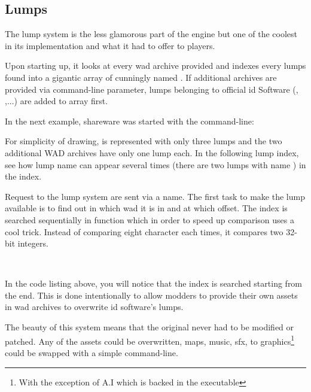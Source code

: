 \subsection{Lumps} \label{wad_detailled}
The lump system is the less glamorous part of the engine but one of the coolest in its implementation and what it had to offer to players.\\
\par
Upon starting up, it looks at every wad archive provided and indexes every lumps found into a gigantic array of  cunningly named . 
If additional archives are provided via  command-line parameter, lumps belonging to official id Software (, ,...) are added to  array first.\\
\par
In the next example, shareware \doom{} was started with the command-line:\\
\par
{}
\par
For simplicity of drawing,  is represented with only three lumps and the two additional WAD archives have only one lump each. In the following lump index, see how lump name can appear several times (there are two lumps with name ) in the index.\\
\par
{}
\par
Request to the lump system are sent via a  name. The first task to make the lump available is to find out in which wad it is in and at which offset. The index is searched sequentially in function  which in order to speed up comparison uses a cool trick. Instead of comparing eight character each times, it compares two  32-bit integers.\\
\par
{}\\
\par
In the code listing above, you will notice that the index is searched starting from the end. This is done intentionally to allow modders to provide their own assets in wad archives to overwrite id software's lumps.\\
\par
The beauty of this system means that the original  never had to be modified or patched. Any of the assets could be overwritten, maps, music, sfx, to graphics\footnote{With the exception of A.I which is backed in the executable} could be swapped with a simple command-line.\\
